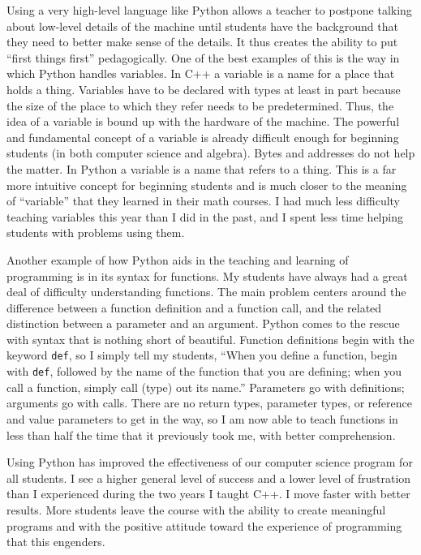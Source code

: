 Using a very high-level language like Python allows a teacher to
postpone talking about low-level details of the machine until students
have the background that they need to better make sense of the
details.  It thus creates the ability to put ``first things first''
pedagogically.  One of the best examples of this is the way in which
Python handles variables. In C++ a variable is a name for a place that
holds a thing.  Variables have to be declared with types at least in
part because the size of the place to which they refer needs to be
predetermined. Thus, the idea of a variable is bound up with the
hardware of the machine. The powerful and fundamental concept of a
variable is already difficult enough for beginning students (in both
computer science and algebra).  Bytes and addresses do not help the
matter. In Python a variable is a name that refers to a thing. This is
a far more intuitive concept for beginning students and is much closer
to the meaning of ``variable'' that they learned in their math
courses. I had much less difficulty teaching variables this year than
I did in the past, and I spent less time helping students with
problems using them.

Another example of how Python aids in the teaching and learning of
programming is in its syntax for functions.  My students have always
had a great deal of difficulty understanding functions. The main
problem centers around the difference between a function definition
and a function call, and the related distinction between a parameter
and an argument. Python comes to the rescue with syntax that is
nothing short of beautiful. Function definitions begin with the
keyword {\tt def}, so I simply tell my students, ``When you define a
function, begin with {\tt def}, followed by the name of the function
that you are defining; when you call a function, simply call (type)
out its name.'' Parameters go with definitions; arguments go with
calls. There are no return types, parameter types, or reference and
value parameters to get in the way, so I am now able to teach
functions in less than half the time that it previously took me, with
better comprehension.

Using Python has improved the effectiveness of our computer science
program for all students.  I see a higher general level of success and
a lower level of frustration than I experienced during the two years I
taught C++.  I move faster with better results.  More students leave
the course with the ability to create meaningful programs and with the
positive attitude toward the experience of programming that this
engenders.


